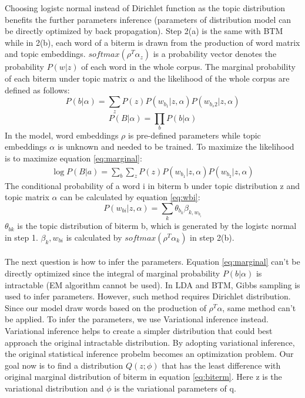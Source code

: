 Choosing logistc normal instead of Dirichlet function as the topic distribution benefits the further parameters inference (parameters of distribution model can be directly optimized by back propagation). Step 2(a) is the same with BTM while in 2(b), each word of a biterm is drawn from the production of word matrix and topic embeddings. $softmax(\rho^T\alpha_z)$ is a probability vector denotes the probability $P(w|z)$ of each word in the whole corpus. The marginal probability of each biterm under topic matrix $\alpha$ and the likelihood of the whole corpus are defined as follows:
\begin{equation}
    P(b|\alpha) = \sum_zP(z)P(w_{b_1}|z,\alpha)P(w_{b_s2}|z,\alpha)
    \label{eq:biterm}
\end{equation}
\begin{equation}
    P(B|\alpha) = \prod_bP(b|\alpha)
    \label{eq:corpus}
\end{equation}
In the model, word embeddings $\rho$ is pre-defined parameters while topic embeddings $\alpha$ is unknown and needed to be trained.
To maximize the likelihood is to maximize equation \ref{eq:marginal}:
\begin{equation}
    \begin{aligned}
        \log P(B|a) = \sum_{b}\sum_zP(z)P(w_{b_1}|z,\alpha)P(w_{b_2}|z,\alpha)
    \end{aligned} 
    \label{eq:marginal}
\end{equation}
The conditional probability of a word i in biterm b under topic distribution z and topic matrix $\alpha$ can be calculated by equation \ref{eq:wbi}:
\begin{equation}
    P(w_{bi}|z,\alpha) = \sum_{k}\theta_{b_k}\beta_{k,w_{b_i}}
\label{eq:wbi}
\end{equation}
$\theta_{bk}$ is the topic distribution of biterm b, which is generated by the logistc normal in step 1. $\beta_k,w_{bi}$ is calculated by $softmax(\rho^T\alpha_k)$ in step 2(b).
\\\\
The next question is how to infer the parameters. Equation \ref{eq:marginal} can't be directly optimized since the integral of marginal probability $P(b|\alpha)$ is intractable (EM algorithm cannot be used). In LDA and BTM, Gibbs sampling is used to infer parameters. However, such method requires Dirichlet distribution. Since our model draw words based on the production of $\rho^T\alpha$, same method can't be applied. To infer the parameters, we use Variational inference\cite{wainwright2008graphical} instead. Variational inference helps to create a simpler distribution that could best approach the original intractable distribution. By adopting variational inference, the original statistical inference probelm becomes an optimization problem. Our goal now is to find a distribution $Q(z; \phi)$ that has the least difference with original marginal distribution of biterm in equation \ref{eq:biterm}. Here z is the variational distribution and $\phi$ is the variational parameters of q.
